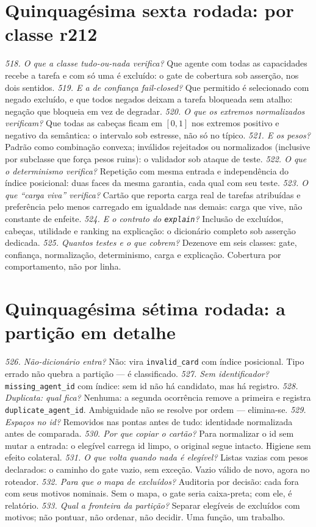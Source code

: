 \section{Quinquagésima sexta rodada: por classe r212}
\textit{518. O que a classe tudo-ou-nada verifica?} Que agente com todas as capacidades recebe a tarefa e com só uma é excluído: o gate de cobertura sob asserção, nos dois sentidos.
\textit{519. E a de confiança fail-closed?} Que permitido é selecionado com negado excluído, e que todos negados deixam a tarefa bloqueada sem atalho: negação que bloqueia em vez de degradar.
\textit{520. O que os extremos normalizados verificam?} Que todas as cabeças ficam em $[0,1]$ nos extremos positivo e negativo da semântica: o intervalo sob estresse, não só no típico.
\textit{521. E os pesos?} Padrão como combinação convexa; inválidos rejeitados ou normalizados (inclusive por subclasse que força pesos ruins): o validador sob ataque de teste.
\textit{522. O que o determinismo verifica?} Repetição com mesma entrada e independência do índice posicional: duas faces da mesma garantia, cada qual com seu teste.
\textit{523. O que ``carga viva'' verifica?} Cartão que reporta carga real de tarefas atribuídas e preferência pelo menos carregado em igualdade nas demais: carga que vive, não constante de enfeite.
\textit{524. E o contrato do \texttt{explain}?} Inclusão de excluídos, cabeças, utilidade e ranking na explicação: o dicionário completo sob asserção dedicada.
\textit{525. Quantos testes e o que cobrem?} Dezenove em seis classes: gate, confiança, normalização, determinismo, carga e explicação. Cobertura por comportamento, não por linha.
\section{Quinquagésima sétima rodada: a partição em detalhe}
\textit{526. Não-dicionário entra?} Não: vira \texttt{invalid\_card} com índice posicional. Tipo errado não quebra a partição --- é classificado.
\textit{527. Sem identificador?} \texttt{missing\_agent\_id} com índice: sem id não há candidato, mas há registro.
\textit{528. Duplicata: qual fica?} Nenhuma: a segunda ocorrência remove a primeira e registra \texttt{duplicate\_agent\_id}. Ambiguidade não se resolve por ordem --- elimina-se.
\textit{529. Espaços no id?} Removidos nas pontas antes de tudo: identidade normalizada antes de comparada.
\textit{530. Por que copiar o cartão?} Para normalizar o id sem mutar a entrada: o elegível carrega id limpo, o original segue intacto. Higiene sem efeito colateral.
\textit{531. O que volta quando nada é elegível?} Listas vazias com pesos declarados: o caminho do gate vazio, sem exceção. Vazio válido de novo, agora no roteador.
\textit{532. Para que o mapa de excluídos?} Auditoria por decisão: cada fora com seus motivos nominais. Sem o mapa, o gate seria caixa-preta; com ele, é relatório.
\textit{533. Qual a fronteira da partição?} Separar elegíveis de excluídos com motivos; não pontuar, não ordenar, não decidir. Uma função, um trabalho.
